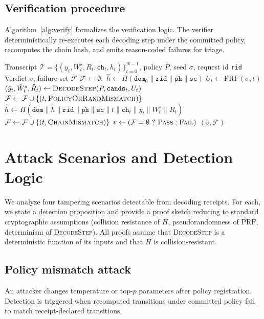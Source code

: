 \documentclass[conference]{IEEEtran}
\newcommand{\proc}[1]{\textnormal{\textsc{#1}}}
\begin{document}
\subsection{Verification procedure}
Algorithm~\ref{alg:verify} formalizes the verification logic. The verifier deterministically re-executes each decoding step under the committed policy, recomputes the chain hash, and emits reason-coded failures for triage.

\begin{algorithm}[t]
\caption{Transcript Verification}\label{alg:verify}
\begin{algorithmic}[1]
\REQUIRE Transcript $\mathcal{T} = \{(y_t, W^s_t, R_t, \texttt{ch}_t, h_t)\}_{t=0}^{N-1}$, policy $P$, seed $\sigma$, request id \texttt{rid}
\ENSURE Verdict $v$, failure set $\mathcal{F}$
\STATE $\mathcal{F} \leftarrow \emptyset$;\ $\hat{h} \leftarrow H(\texttt{dom}_0 \| \texttt{rid} \| \texttt{ph} \| \texttt{sc})$ 
  \STATE $U_t \leftarrow \text{PRF}(\sigma, t)$ 
  \STATE $(\hat{y}_t, \hat{W}^s_t, \hat{R}_t) \leftarrow \proc{DecodeStep}(P, \texttt{cands}_t, U_t)$
    \STATE $\mathcal{F} \leftarrow \mathcal{F} \cup \{(t, \proc{PolicyOrRandMismatch})\}$
  \ENDIF
  \STATE $\hat{h} \leftarrow H(\texttt{dom} \| \hat{h} \| \texttt{rid} \| \texttt{ph} \| \texttt{sc} \| t \| \texttt{ch}_t \| y_t \| W^s_t \| R_t)$
    \STATE $\mathcal{F} \leftarrow \mathcal{F} \cup \{(t, \proc{ChainMismatch})\}$
  \ENDIF
\ENDFOR
\STATE $v \leftarrow (\mathcal{F} = \emptyset\ ?\ \proc{Pass} : \proc{Fail})$
\RETURN $(v, \mathcal{F})$
\end{algorithmic}
\end{algorithm}

\section{Attack Scenarios and Detection Logic}
We analyze four tampering scenarios detectable from decoding receipts. For each, we state a detection proposition and provide a proof sketch reducing to standard cryptographic assumptions (collision resistance of $H$, pseudorandomness of $\mathrm{PRF}$, determinism of \proc{DecodeStep}). All proofs assume that \proc{DecodeStep} is a deterministic function of its inputs and that $H$ is collision-resistant.

\subsection{Policy mismatch attack}
An attacker changes temperature or top-$p$ parameters after policy registration. Detection is triggered when recomputed transitions under committed policy fail to match receipt-declared transitions.
\end{document}
